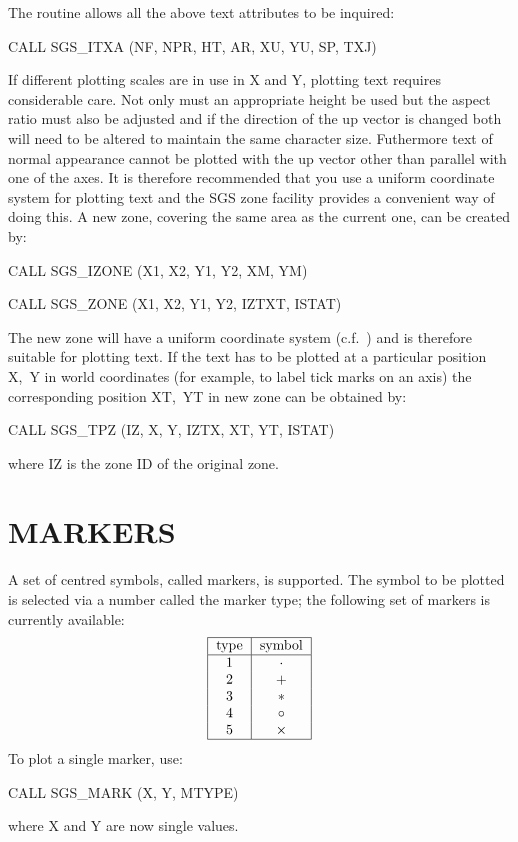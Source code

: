 \documentclass[11pt]{starlink}
\begin{document}
The routine
allows all the above text attributes to be inquired:
\begin{terminalv}
CALL SGS_ITXA (NF, NPR, HT, AR, XU, YU, SP, TXJ)
\end{terminalv}
If different plotting scales are in use in X and Y, plotting text requires
considerable care.  Not only must an appropriate height be used but the aspect
ratio must also be adjusted and if the direction of the up vector is changed
both will need to be altered to maintain the same character size.  Futhermore
text of normal appearance cannot be plotted with the up vector other than
parallel with one of the axes.
It is therefore recommended that you use a uniform coordinate system for
plotting text and the SGS zone facility provides a convenient way of doing
this.  A new zone, covering the same area as the current
one, can be created by:
\begin{terminalv}
CALL SGS_IZONE (X1, X2, Y1, Y2, XM, YM)

CALL SGS_ZONE (X1, X2, Y1, Y2, IZTXT, ISTAT)
\end{terminalv}
The new zone will have a uniform coordinate system (c.f.\
) and is
therefore suitable for plotting text.  If the text has to be plotted at a
particular position X,~Y in world coordinates (for example, to label tick
marks on an axis) the corresponding position XT,~YT in new zone can be obtained
by:
\begin{terminalv}
CALL SGS_TPZ (IZ, X, Y, IZTX, XT, YT, ISTAT)
\end{terminalv}
where IZ is the zone ID of the original zone.

\section {MARKERS}\label{sec-markers}

A set of centred symbols, called markers, is supported.  The
symbol to be plotted is selected via a number called the marker
type;  the following set of markers is currently available:
\[\tt\begin{tabular}{|c|c|}\hline
type&symbol\\\hline
1&$\cdot$\\
2&$+$\\
3&$\ast$\\
4&$\circ$\\
5&$\times$\\\hline
\end{tabular}\]
To plot a single marker,
use:
\begin{terminalv}
CALL SGS_MARK (X, Y, MTYPE)
\end{terminalv}
where X and Y are now single values.
\end{document}
